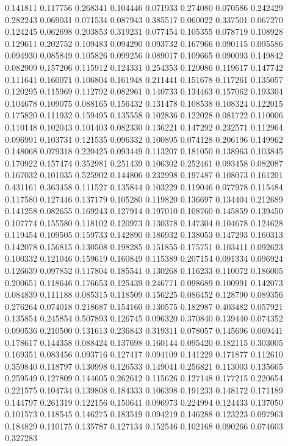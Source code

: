 0.141811
0.117756
0.268341
0.104446
0.071933
0.274080
0.070586
0.242429
0.282243
0.069031
0.071534
0.087943
0.385517
0.060022
0.337501
0.067270
0.124245
0.062698
0.203853
0.319231
0.077454
0.105355
0.078719
0.108928
0.129611
0.202752
0.109483
0.094290
0.093732
0.167966
0.090115
0.095586
0.094930
0.085849
0.105826
0.099256
0.089017
0.109665
0.090093
0.149842
0.082909
0.157206
0.115912
0.124331
0.254353
0.120086
0.119617
0.147742
0.111641
0.160071
0.106804
0.161948
0.211441
0.151678
0.117261
0.135057
0.120295
0.115969
0.112792
0.082961
0.140733
0.134463
0.157062
0.193304
0.104678
0.109075
0.088165
0.156432
0.131478
0.108538
0.108324
0.122015
0.175820
0.111932
0.159495
0.135558
0.102836
0.122028
0.081722
0.110006
0.110148
0.102043
0.101403
0.082330
0.136221
0.147292
0.232571
0.112964
0.096991
0.103731
0.121535
0.096332
0.100895
0.074128
0.206196
0.149962
0.148068
0.079318
0.220425
0.093449
0.113207
0.181050
0.138963
0.103845
0.170922
0.157474
0.352981
0.251439
0.106302
0.252461
0.093458
0.082087
0.167032
0.101035
0.525902
0.144806
0.232998
0.197487
0.108073
0.161201
0.431161
0.363458
0.111527
0.135844
0.103229
0.119046
0.077978
0.115484
0.117580
0.127446
0.137179
0.105280
0.119820
0.136697
0.134404
0.212689
0.141258
0.082655
0.169243
0.127914
0.197010
0.108760
0.145859
0.139450
0.107774
0.155580
0.118102
0.120973
0.130378
0.147304
0.104678
0.124628
0.119454
0.109505
0.159733
0.142890
0.186932
0.138053
0.147293
0.160313
0.142078
0.156815
0.130508
0.198285
0.151855
0.175751
0.103411
0.092623
0.100332
0.121046
0.159619
0.160849
0.115389
0.207154
0.091334
0.096924
0.126639
0.097852
0.117804
0.185541
0.130268
0.116233
0.110072
0.186005
0.200651
0.118646
0.176653
0.125439
0.246771
0.098689
0.100991
0.142073
0.084839
0.111188
0.085315
0.118509
0.156225
0.086452
0.128790
0.089356
0.276264
0.074018
0.218687
0.154160
0.130575
0.182987
0.403482
0.057921
0.135854
0.245854
0.507893
0.126745
0.096320
0.370840
0.139440
0.074352
0.090536
0.210500
0.131613
0.236843
0.319311
0.078057
0.145696
0.069441
0.178617
0.144358
0.088424
0.137698
0.160144
0.095420
0.182115
0.303005
0.169351
0.083456
0.093716
0.127417
0.094109
0.141229
0.171877
0.112610
0.359840
0.118797
0.130998
0.126533
0.149041
0.256821
0.113003
0.135665
0.259549
0.127809
0.144605
0.262612
0.115626
0.127148
0.177215
0.220654
0.221575
0.104734
0.139808
0.184333
0.106398
0.191233
0.148172
0.171189
0.144797
0.261319
0.122156
0.150641
0.096973
0.224994
0.124433
0.137050
0.101573
0.118545
0.146275
0.183519
0.094219
0.146288
0.123223
0.097963
0.184829
0.110175
0.135787
0.127134
0.152546
0.102168
0.090266
0.074603
0.327283
